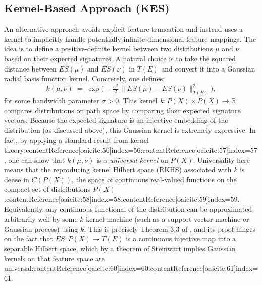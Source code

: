 \documentclass[11pt]{article}
\begin{document}
\subsection{Kernel-Based Approach (KES)}
An alternative approach avoids explicit feature truncation and instead uses a kernel to implicitly handle potentially infinite-dimensional feature mappings. The idea is to define a positive-definite kernel between two distributions $\mu$ and $\nu$ based on their expected signatures. A natural choice is to take the squared distance between $ES(\mu)$ and $ES(\nu)$ in $T(E)$ and convert it into a Gaussian radial basis function kernel. Concretely, one defines:
\begin{equation}
\label{eq:kernel}
k(\mu,\nu) \;=\; \exp\!\Big(-\tfrac{\sigma^2}{2}\,\|ES(\mu) - ES(\nu)\|^2_{T(E)}\Big),
\end{equation}
for some bandwidth parameter $\sigma>0$. This kernel $k: P(X)\times P(X)\to \mathbb{R}$ compares distributions on path space by comparing their expected signature vectors. Because the expected signature is an injective embedding of the distribution (as discussed above), this Gaussian kernel is extremely expressive. In fact, by applying a standard result from kernel theory:contentReference[oaicite:56]{index=56}:contentReference[oaicite:57]{index=57}, one can show that $k(\mu,\nu)$ is a \emph{universal kernel} on $P(X)$. Universality here means that the reproducing kernel Hilbert space (RKHS) associated with $k$ is dense in $C(P(X))$, the space of continuous real-valued functions on the compact set of distributions $P(X)$:contentReference[oaicite:58]{index=58}:contentReference[oaicite:59]{index=59}. Equivalently, any continuous functional of the distribution can be approximated arbitrarily well by some $k$-kernel machine (such as a support vector machine or Gaussian process) using $k$. This is precisely Theorem 3.3 of \cite{Lemercier2021}, and its proof hinges on the fact that $ES: P(X)\to T(E)$ is a continuous injective map into a separable Hilbert space, which by a theorem of Steinwart implies Gaussian kernels on that feature space are universal:contentReference[oaicite:60]{index=60}:contentReference[oaicite:61]{index=61}.
\end{document}
